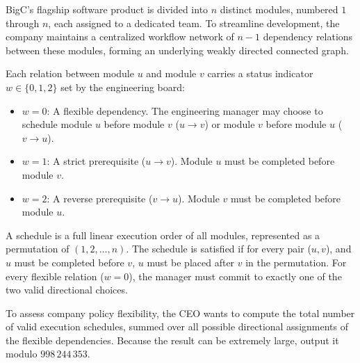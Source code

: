BigC's flagship software product is divided into $n$ distinct modules, numbered $1$ through $n$, each assigned to a dedicated team. 
To streamline development, the company maintains a centralized workflow network of $n - 1$ dependency relations between these modules, forming an underlying weakly directed connected graph.

Each relation between module $u$ and module $v$ carries a status indicator $w \in \{0, 1, 2\}$ set by the engineering board:

\begin{itemize}
  \item $w = 0$: A flexible dependency. The engineering manager may choose to schedule module $u$ before module $v$ ($u \to v$) or module $v$ before module $u$ ($v \to u$).
  \item $w = 1$: A strict prerequisite ($u \to v$). Module $u$ must be completed before module $v$.
  \item $w = 2$: A reverse prerequisite ($v \to u$). Module $v$ must be completed before module $u$.
\end{itemize}

A schedule is a full linear execution order of all modules, represented as a permutation of $(1, 2, \dots, n)$. The schedule is satisfied if for every pair ($u, v$), and $u$ must be completed before $v$, $u$ must be placed after $v$ in the permutation. For every flexible relation ($w = 0$), the manager must commit to exactly one of the two valid directional choices.

To assess company policy flexibility, the CEO wants to compute the total number of valid execution schedules, summed over all possible directional assignments of the flexible dependencies. Because the result can be extremely large, output it modulo $998\,244\,353$.